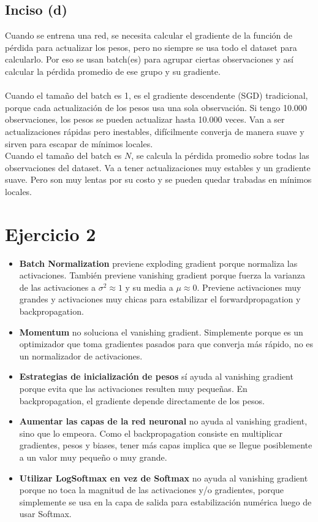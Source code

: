 \documentclass[12pt, a4paper]{article}
\begin{document}
        \subsection*{Inciso (d)}
            \noindent Cuando se entrena una red, se necesita calcular el gradiente de la función de pérdida para actualizar los pesos, pero no siempre se usa todo el dataset para calcularlo. Por eso se usan batch(es) para agrupar ciertas observaciones y así calcular la pérdida promedio de ese grupo y su gradiente. \\
            \\
            Cuando el tamaño del batch es 1, es el gradiente descendente (SGD) tradicional, porque cada actualización de los pesos usa una sola observación. Si tengo 10.000 observaciones, los pesos se pueden actualizar hasta 10.000 veces. Van a ser actualizaciones rápidas pero inestables, difícilmente converja de manera suave y sirven para escapar de mínimos locales. \\
            Cuando el tamaño del batch es $N$, se calcula la pérdida promedio sobre todas las observaciones del dataset. Va a tener actualizaciones muy estables y un gradiente suave. Pero son muy lentas por su costo y se pueden quedar trabadas en mínimos locales.
    \section*{Ejercicio 2}
        \begin{itemize}
            \item \textbf{Batch Normalization} previene exploding gradient porque normaliza las activaciones. También previene vanishing gradient porque fuerza la varianza de las activaciones a $\sigma^{2} \approx 1$ y su media a $\mu \approx 0$. Previene activaciones muy grandes y activaciones muy chicas para estabilizar el forwardpropagation y backpropagation.
            \item \textbf{Momentum} no soluciona el vanishing gradient. Simplemente porque es un optimizador que toma gradientes pasados para que converja más rápido, no es un normalizador de activaciones.
            \item \textbf{Estrategias de inicialización de pesos} sí ayuda al vanishing gradient porque evita que las activaciones resulten muy pequeñas. En backpropagation, el gradiente depende directamente de los pesos.
            \item \textbf{Aumentar las capas de la red neuronal} no ayuda al vanishing gradient, sino que lo empeora. Como el backpropagation consiste en multiplicar gradientes, pesos y biases, tener más capas implica que se llegue posiblemente a un valor muy pequeño o muy grande.
            \item \textbf{Utilizar LogSoftmax en vez de Softmax} no ayuda al vanishing gradient porque no toca la magnitud de las activaciones y/o gradientes, porque simplemente se usa en la capa de salida para estabilización numérica luego de usar Softmax.
        \end{itemize}
\end{document}
